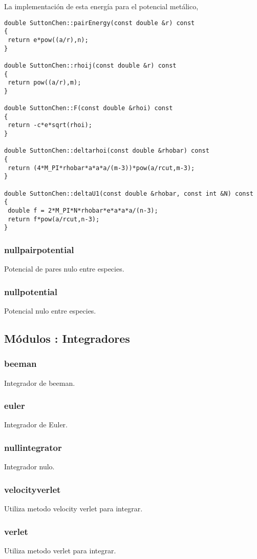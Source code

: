 \documentclass[a4paper,10pt]{scrbook}
\begin{document}
La implementaci\'on de esta energ\'ia para el potencial met\'alico, 

\begin{verbatim}
double SuttonChen::pairEnergy(const double &r) const
{
 return e*pow((a/r),n);
}

double SuttonChen::rhoij(const double &r) const
{
 return pow((a/r),m);
}

double SuttonChen::F(const double &rhoi) const
{
 return -c*e*sqrt(rhoi);
}

double SuttonChen::deltarhoi(const double &rhobar) const
{
 return (4*M_PI*rhobar*a*a*a/(m-3))*pow(a/rcut,m-3);
}

double SuttonChen::deltaU1(const double &rhobar, const int &N) const
{
 double f = 2*M_PI*N*rhobar*e*a*a*a/(n-3);
 return f*pow(a/rcut,n-3);
}
\end{verbatim}


\subsubsection{nullpairpotential}
Potencial de pares nulo entre especies.
\subsubsection{nullpotential}
Potencial nulo entre especies.

\subsection{M\'odulos : Integradores}
\subsubsection{beeman}
Integrador de beeman.
\subsubsection{euler}
Integrador de Euler.
\subsubsection{nullintegrator}
Integrador nulo.
\subsubsection{velocityverlet}
Utiliza metodo velocity verlet para integrar.
\subsubsection{verlet}
Utiliza metodo verlet para integrar.
\end{document}
